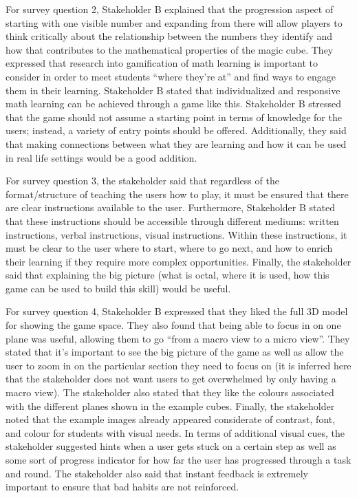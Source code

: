 \documentclass{article}
\begin{document}
For survey question 2, Stakeholder B explained that the progression aspect of starting with one visible number and expanding from there will allow players to think critically about the relationship between the numbers they identify and how that contributes to the mathematical properties of the magic cube. They expressed that research into gamification of math learning is important to consider in order to meet students ``where they're at'' and find ways to engage them in their learning. Stakeholder B stated that individualized and responsive math learning can be achieved through a game like this. Stakeholder B stressed that the game should not assume a starting point in terms of knowledge for the users; instead, a variety of entry points should be offered. Additionally, they said that making connections between what they are learning and how it can be used in real life settings would be a good addition.

For survey question 3, the stakeholder said that regardless of the format/structure of teaching the users how to play, it must be ensured that there are clear instructions available to the user. Furthermore, Stakeholder B stated that these instructions should be accessible through different mediums: written instructions, verbal instructions, visual instructions. Within these instructions, it must be clear to the user where to start, where to go next, and how to enrich their learning if they require more complex opportunities. Finally, the stakeholder said that explaining the big picture (what is octal, where it is used, how this game can be used to build this skill) would be useful.

For survey question 4, Stakeholder B expressed that they liked the full 3D model for showing the game space. They also found that being able to focus in on one plane was useful, allowing them to go ``from a macro view to a micro view''. They stated that it's important to see the big picture of the game as well as allow the user to zoom in on the particular section they need to focus on (it is inferred here that the stakeholder does not want users to get overwhelmed by only having a macro view). The stakeholder also stated that they like the colours associated with the different planes shown in the example cubes. Finally, the stakeholder noted that the example images already appeared considerate of contrast, font, and colour for students with visual needs. In terms of additional visual cues, the stakeholder suggested hints when a user gets stuck on a certain step as well as some sort of progress indicator for how far the user has progressed through a task and round. The stakeholder also said that instant feedback is extremely important to ensure that bad habits are not reinforced.
\end{document}
